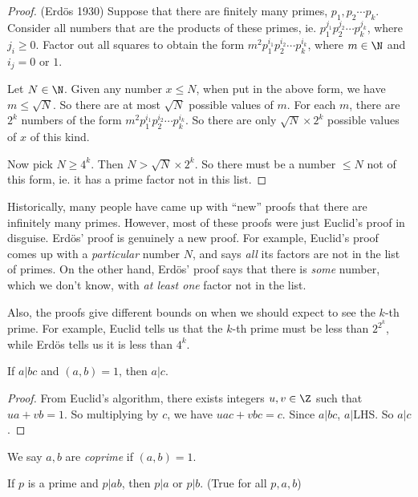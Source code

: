 \documentclass[a4paper]{article}
\begin{document}
\begin{proof}
  (Erd\"{o}s 1930) Suppose that there are finitely many primes, $p_1, p_2\cdots p_k$. Consider all numbers that are the products of these primes, ie. $p_1^{j_1}p_2^{j_2}\cdots p_k^{j_k}$, where $j_i \geq 0$. Factor out all squares to obtain the form $m^2p_1^{i_1}p_2^{i_2}\cdots p_k^{i_k}$, where $m\in \N$ and $i_j = 0$ or $1$.

  Let $N\in\N$. Given any number $x \leq N$, when put in the above form, we have $m \leq \sqrt{N}$. So there are at most $\sqrt{N}$ possible values of $m$. For each $m$, there are $2^k$ numbers of the form $m^2p_1^{i_1}p_2^{i_2}\cdots p_k^{i_k}$. So there are only $\sqrt{N}\times 2^k$ possible values of $x$ of this kind.

  Now pick $N\geq 4^k$. Then $N > \sqrt{N}\times 2^k$. So there must be a number $\leq N$ not of this form, ie. it has a prime factor not in this list.
\end{proof}
Historically, many people have came up with ``new'' proofs that there are infinitely many primes. However, most of these proofs were just Euclid's proof in disguise. Erd\"os' proof is genuinely a new proof. For example, Euclid's proof comes up with a \emph{particular} number $N$, and says \emph{all} its factors are not in the list of primes. On the other hand, Erd\"os' proof says that there is \emph{some} number, which we don't know, with \emph{at least one} factor not in the list.

Also, the proofs give different bounds on when we should expect to see the $k$-th prime. For example, Euclid tells us that the $k$-th prime must be less than $2^{2^k}$, while Erd\"os tells us it is less than $4^k$.

\begin{thm}
  If $a| bc$ and $(a, b) = 1$, then $a | c$.
\end{thm}

\begin{proof}
  From Euclid's algorithm, there exists integers $u, v\in \Z$ such that $ua + vb = 1$. So multiplying by $c$,  we have $uac + vbc = c$. Since $a | bc$,  $a | $LHS. So $a | c$.
\end{proof}

\begin{defi}
  We say $a, b$ are \emph{coprime} if $(a, b) = 1$.
\end{defi}

\begin{cor}
  If $p$ is a prime and $p|ab$, then $p|a$ or $p|b$. (True for all $p, a, b$)
\end{cor}
\end{document}
